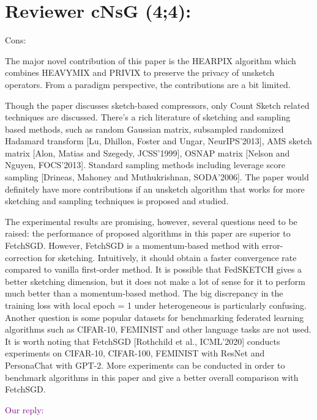 \documentclass{article}
\begin{document}
\section{Reviewer cNsG (4;4):}

Cons:

The major novel contribution of this paper is the HEARPIX algorithm which combines HEAVYMIX and PRIVIX to preserve the privacy of unsketch operators. From a paradigm perspective, the contributions are a bit limited.

Though the paper discusses sketch-based compressors, only Count Sketch related techniques are discussed. There’s a rich literature of sketching and sampling based methods, such as random Gaussian matrix, subsampled randomized Hadamard transform [Lu, Dhillon, Foster and Ungar, NeurIPS’2013], AMS sketch matrix [Alon, Matias and Szegedy, JCSS’1999], OSNAP matrix [Nelson and Nguyen, FOCS’2013]. Standard sampling methods including leverage score sampling [Drineas, Mahoney and Muthukrishnan, SODA’2006]. The paper would definitely have more contributions if an unsketch algorithm that works for more sketching and sampling techniques is proposed and studied.

The experimental results are promising, however, several questions need to be raised: the performance of proposed algorithms in this paper are superior to FetchSGD. However, FetchSGD is a momentum-based method with error-correction for sketching. Intuitively, it should obtain a faster convergence rate compared to vanilla first-order method. It is possible that FedSKETCH gives a better sketching dimension, but it does not make a lot of sense for it to perform much better than a momentum-based method. The big discrepancy in the training loss with local epoch = 1 under heterogeneous is particularly confusing. Another question is some popular datasets for benchmarking federated learning algorithms such as CIFAR-10, FEMINIST and other language tasks are not used. It is worth noting that FetchSGD [Rothchild et al., ICML’2020] conducts experiments on CIFAR-10, CIFAR-100, FEMINIST with ResNet and PersonaChat with GPT-2. More experiments can be conducted in order to benchmark algorithms in this paper and give a better overall comparison with FetchSGD.

\textcolor{purple}{Our reply:}
\end{document}
